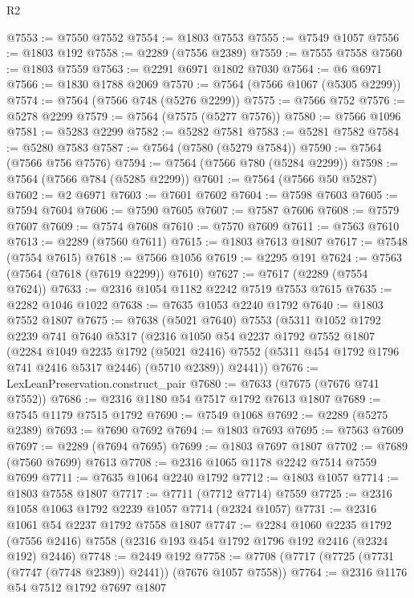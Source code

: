 \begin{lexlean}{R2}
\begin{coremodule}
@7553 := @7550 @7552
@7554 := @1803 @7553
@7555 := @7549 @1057
@7556 := @1803 @192
@7558 := @2289 (@7556 @2389)
@7559 := @7555 @7558
@7560 := @1803 @7559
@7563 := @2291 @6971 @1802 @7030
@7564 := @6 @6971
@7566 := @1830 @1788 @2069
@7570 := @7564 (@7566 @1067 (@5305 @2299))
@7574 := @7564 (@7566 @748 (@5276 @2299))
@7575 := @7566 @752
@7576 := @5278 @2299
@7579 := @7564 (@7575 (@5277 @7576))
@7580 := @7566 @1096
@7581 := @5283 @2299
@7582 := @5282 @7581
@7583 := @5281 @7582
@7584 := @5280 @7583
@7587 := @7564 (@7580 (@5279 @7584))
@7590 := @7564 (@7566 @756 @7576)
@7594 := @7564 (@7566 @780 (@5284 @2299))
@7598 := @7564 (@7566 @784 (@5285 @2299))
@7601 := @7564 (@7566 @50 @5287)
@7602 := @2 @6971
@7603 := @7601 @7602
@7604 := @7598 @7603
@7605 := @7594 @7604
@7606 := @7590 @7605
@7607 := @7587 @7606
@7608 := @7579 @7607
@7609 := @7574 @7608
@7610 := @7570 @7609
@7611 := @7563 @7610
@7613 := @2289 (@7560 @7611)
@7615 := @1803 @7613 @1807
@7617 := @7548 (@7554 @7615)
@7618 := @7566 @1056
@7619 := @2295 @191
@7624 := @7563 (@7564 (@7618 (@7619 @2299)) @7610)
@7627 := @7617 (@2289 (@7554 @7624))
@7633 := @2316 @1054 @1182 @2242 @7519 @7553 @7615
@7635 := @2282 @1046 @1022
@7638 := @7635 @1053 @2240 @1792
@7640 := @1803 @7552 @1807
@7675 := @7638
    (@5021 @7640)
    @7553
    (@5311
      @1052
      @1792
      @2239
      @741
      @7640
      @5317
      (@2316
        @1050
        @54
        @2237
        @1792
        @7552
        @1807
        (@2284
          @1049
          @2235
          @1792
          (@5021 @2416)
          @7552
          (@5311 @454 @1792 @1796 @741 @2416 @5317 @2446)
          (@5710 @2389))
        @2441))
@7676 := LexLeanPreservation.construct_pair
@7680 := @7633 (@7675 (@7676 @741 @7552))
@7686 := @2316 @1180 @54 @7517 @1792 @7613 @1807
@7689 := @7545 @1179 @7515 @1792
@7690 := @7549 @1068
@7692 := @2289 (@5275 @2389)
@7693 := @7690 @7692
@7694 := @1803 @7693
@7695 := @7563 @7609
@7697 := @2289 (@7694 @7695)
@7699 := @1803 @7697 @1807
@7702 := @7689 (@7560 @7699) @7613
@7708 := @2316 @1065 @1178 @2242 @7514 @7559 @7699
@7711 := @7635 @1064 @2240 @1792
@7712 := @1803 @1057
@7714 := @1803 @7558 @1807
@7717 := @7711 (@7712 @7714) @7559
@7725 := @2316 @1058 @1063 @1792 @2239 @1057 @7714 (@2324 @1057)
@7731 := @2316 @1061 @54 @2237 @1792 @7558 @1807
@7747 := @2284
    @1060
    @2235
    @1792
    (@7556 @2416)
    @7558
    (@2316 @193 @454 @1792 @1796 @192 @2416 (@2324 @192) @2446)
@7748 := @2449 @192
@7758 := @7708 (@7717 (@7725 (@7731 (@7747 (@7748 @2389)) @2441)) (@7676 @1057 @7558))
@7764 := @2316 @1176 @54 @7512 @1792 @7697 @1807

\end{coremodule}
\end{lexlean}
